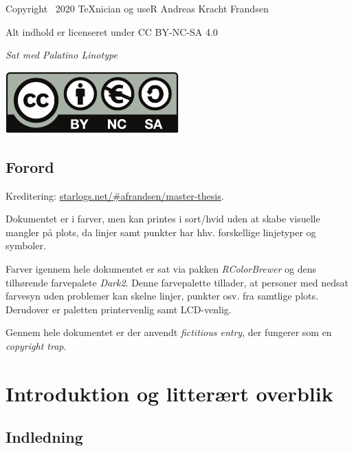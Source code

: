 \documentclass[
  a4paper,
  oneside]{memoir}
\begin{document}
\newpage

\vspace*{\fill}

Copyright \textcopyright\, 2020 \TeX nician og useR Andreas Kracht Frandsen

Alt indhold er licenseret under CC BY-NC-SA 4.0

\textit{Sat med Palatino Linotype}

\includegraphics[width=0.15\linewidth]{latex/bync}
\newpage


{
  \hypersetup{linkcolor=black}
  \tableofcontents
}

\newpage

{
  \hypersetup{linkcolor=black}
  \listoffigures

  \listoftables
}

\newpage

\hypertarget{forord}{%
\chapter*{Forord}\label{forord}}

Kreditering: \href{http://starlogs.net/\#afrandsen/master-thesis}{starlogs.net/\#afrandsen/master-thesis}.

Dokumentet er i farver, men kan printes i sort/hvid uden at skabe visuelle mangler på plots, da linjer samt punkter har hhv. forskellige linjetyper og symboler.

Farver igennem hele dokumentet er sat via pakken \emph{RColorBrewer} og dens tilhørende farvepalete \emph{Dark2}. Denne farvepalette tillader, at personer med nedsat farvesyn uden problemer kan skelne linjer, punkter osv. fra samtlige plots. Derudover er paletten printervenlig samt LCD-venlig.

Gennem hele dokumentet er der anvendt \emph{fictitious entry}, der fungerer som en \emph{copyright trap}.
\newpage


\setcounter{secnumdepth}{3}

\part{Introduktion og litterært overblik}

\hypertarget{indledning}{%
\chapter{Indledning}\label{indledning}}
\end{document}
